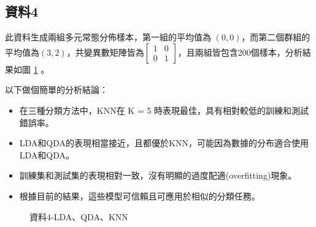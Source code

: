 \subsection{資料4}
此資料生成兩組多元常態分佈樣本，第一組的平均值為 $(0, 0)$，而第二個群組的平均值為$(3, 2)$，共變異數矩陣皆為$\begin{bmatrix}1 & 0 \\0 & 1 \end{bmatrix}$，且兩組皆包含200個樣本，分析結果如圖 \ref{fig:la4-LDAQDAKNN} 。

以下做個簡單的分析結論：
\begin{itemize}
\item 在三種分類方法中，KNN在 K = 5 時表現最佳，具有相對較低的訓練和測試錯誤率。
\item LDA和QDA的表現相當接近，且都優於KNN，可能因為數據的分布適合使用LDA和QDA。
\item 訓練集和測試集的表現相對一致，沒有明顯的過度配適(overfitting)現象。
\item 根據目前的結果，這些模型可信賴且可應用於相似的分類任務。
\end{itemize}
\begin{table} [h]
\centering
    \caption{資料4之LDA、QDA、KNN錯判率}\label{tb:la4-LDAQDAKNN}
    \renewcommand\arraystretch{1.5}
\end{table}
\vspace{30pt}
\begin{figure}[h]
    \caption{資料4-LDA、QDA、KNN}
    \label{fig:la4-LDAQDAKNN}
\end{figure}

